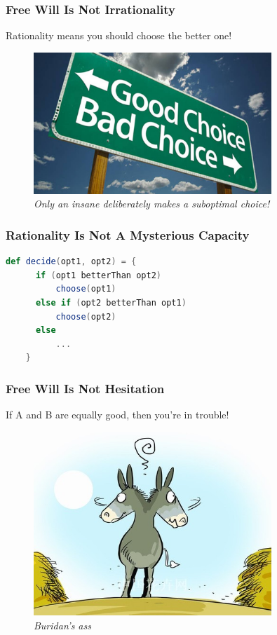 \documentclass[xcolor=dvipsnames]{beamer}
\theoremstyle{definition}
\begin{document}
\begin{frame}[fragile]
  \frametitle{Free Will Is Not Irrationality}
  Rationality means you should choose the better one!

  \begin{figure}
    \centering
    \includegraphics[width=0.8\textwidth]{images/rationality.jpg}\\
    \emph{Only an insane deliberately makes a suboptimal choice!}
  \end{figure}
\end{frame}

\begin{frame}[fragile]
  \frametitle{Rationality Is Not A Mysterious Capacity}

  \begin{lstlisting}[language=Scala]
    def decide(opt1, opt2) = {
      if (opt1 betterThan opt2)
          choose(opt1)
      else if (opt2 betterThan opt1)
          choose(opt2)
      else
          ...
    }
  \end{lstlisting}
\end{frame}

\begin{frame}[fragile]
  \frametitle{Free Will Is Not Hesitation}
  If A and B are equally good, then you're in trouble!

  \begin{figure}
    \centering
    \includegraphics[width=0.8\textwidth]{images/ass.jpg}\\
    \emph{Buridan's ass}
  \end{figure}
\end{frame}
\end{document}
